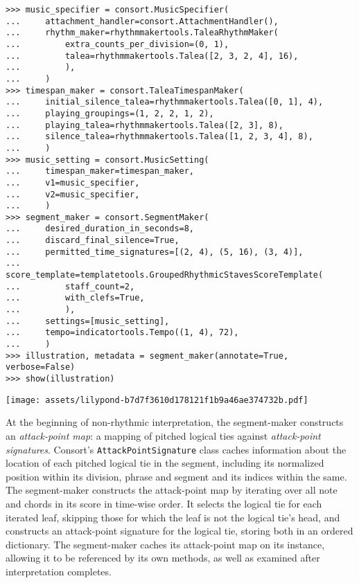 \begin{abjadbookoutput}
\begin{singlespacing}
\vspace{-0.5\baselineskip}
\begin{verbatim}
>>> music_specifier = consort.MusicSpecifier(
...     attachment_handler=consort.AttachmentHandler(),
...     rhythm_maker=rhythmmakertools.TaleaRhythmMaker(
...         extra_counts_per_division=(0, 1),
...         talea=rhythmmakertools.Talea([2, 3, 2, 4], 16),
...         ),
...     )
>>> timespan_maker = consort.TaleaTimespanMaker(
...     initial_silence_talea=rhythmmakertools.Talea([0, 1], 4),
...     playing_groupings=(1, 2, 2, 1, 2),
...     playing_talea=rhythmmakertools.Talea([2, 3], 8),
...     silence_talea=rhythmmakertools.Talea([1, 2, 3, 4], 8),
...     )
>>> music_setting = consort.MusicSetting(
...     timespan_maker=timespan_maker,
...     v1=music_specifier,
...     v2=music_specifier,
...     )
>>> segment_maker = consort.SegmentMaker(
...     desired_duration_in_seconds=8,
...     discard_final_silence=True,
...     permitted_time_signatures=[(2, 4), (5, 16), (3, 4)],
...     score_template=templatetools.GroupedRhythmicStavesScoreTemplate(
...         staff_count=2,
...         with_clefs=True,
...         ),
...     settings=[music_setting],
...     tempo=indicatortools.Tempo((1, 4), 72),
...     )
>>> illustration, metadata = segment_maker(annotate=True, verbose=False)
>>> show(illustration)
\end{verbatim}
\noindent\texttt{[image: assets/lilypond-b7d7f3610d178121f1b9a46ae374732b.pdf]}
\end{singlespacing}
\end{abjadbookoutput}

\noindent At the beginning of non-rhythmic interpretation, the segment-maker
constructs an \emph{attack-point map}: a mapping of pitched logical ties
against \emph{attack-point signatures}. Consort's \texttt{AttackPointSignature}
class caches information about the location of each pitched logical tie in the
segment, including its normalized position within its division, phrase and
segment and its indices within the same. The segment-maker constructs the
attack-point map by iterating over all note and chords in its score in
time-wise order. It selects the logical tie for each iterated leaf, skipping
those for which the leaf is not the logical tie's head, and constructs an
attack-point signature for the logical tie, storing both in an ordered
dictionary. The segment-maker caches its attack-point map on its instance,
allowing it to be referenced by its own methods, as well as examined after
interpretation completes.

